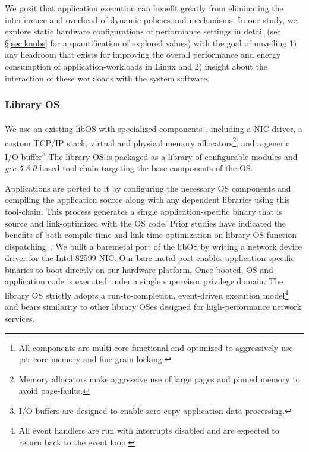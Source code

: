 We posit that application execution can benefit greatly from eliminating the interference and overhead of dynamic policies and mechanisms. In our study, we explore static hardware configurations of performance settings in detail (see \S\ref{sec:knobs} for a quantification of explored values) with the goal of unveiling 1) any headroom that exists for improving the overall performance and energy consumption of application-workloads in Linux and 2) insight about the interaction of these workloads with the system software.



\subsubsection{Library OS}
\label{sec:OS_libos}
We use an existing libOS with specialized components\footnote{ All components are multi-core functional and optimized to aggressively use per-core memory and fine grain locking.}, including a NIC driver, a custom TCP/IP stack, virtual and physical memory allocators\footnote{Memory allocators make aggressive use of large pages and pinned memory to avoid page-faults.}, and a generic I/O buffer\footnote{I/O buffers are designed to enable zero-copy application data processing.} The library OS is packaged as a library of configurable modules and \textit{gcc-5.3.0}-based tool-chain targeting the base components of the OS. 

Applications are ported to it by configuring the necessary OS components and compiling the application source along with any dependent libraries using this tool-chain. This process generates a single application-specific binary that is source and link-optimized with the OS code. Prior studies have indicated the benefits of both compile-time and link-time optimization on library OS function dispatching~\cite{ebbrt}. We built a baremetal port of the libOS by writing a network device driver for the Intel 82599 NIC. Our bare-metal port enables application-specific binaries to boot directly on our hardware platform. Once booted, OS and application code is executed under a single supervisor privilege domain. The library OS strictly adopts a run-to-completion, event-driven execution model\footnote{All event handlers are run with interrupts disabled and are expected to return back to the event loop.} and bears similarity to other library OSes designed for high-performance network services\cite{ix,seda,arrakis,ebbrt}. 

